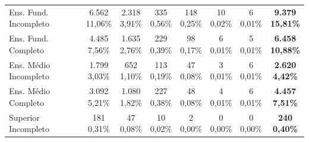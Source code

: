 \documentclass[12pt,a4paper]{article}
\begin{document}
\begin{table}[H]
{\begin{tabular}{lccccccc}
Ens. Fund. Incompleto &
\makecell{6.562 \\ \scriptsize 11,06\%} & \makecell{2.318 \\ \scriptsize 3,91\%} & \makecell{335 \\ \scriptsize 0,56\%} & \makecell{148 \\ \scriptsize 0,25\%} & \makecell{10 \\ \scriptsize 0,02\%} & \makecell{6 \\ \scriptsize 0,01\%} & \makecell{\textbf{9.379} \\ \scriptsize\textbf{15,81\%}} \\
Ens. Fund. Completo &
\makecell{4.485 \\ \scriptsize 7,56\%} & \makecell{1.635 \\ \scriptsize 2,76\%} & \makecell{229 \\ \scriptsize 0,39\%} & \makecell{98 \\ \scriptsize 0,17\%} & \makecell{6 \\ \scriptsize 0,01\%} & \makecell{5 \\ \scriptsize 0,01\%} & \makecell{\textbf{6.458} \\ \scriptsize\textbf{10,88\%}} \\
Ens. Médio Incompleto &
\makecell{1.799 \\ \scriptsize 3,03\%} & \makecell{652 \\ \scriptsize 1,10\%} & \makecell{113 \\ \scriptsize 0,19\%} & \makecell{47 \\ \scriptsize 0,08\%} & \makecell{3 \\ \scriptsize 0,01\%} & \makecell{6 \\ \scriptsize 0,01\%} & \makecell{\textbf{2.620} \\ \scriptsize\textbf{4,42\%}} \\
Ens. Médio Completo &
\makecell{3.092 \\ \scriptsize 5,21\%} & \makecell{1.080 \\ \scriptsize 1,82\%} & \makecell{227 \\ \scriptsize 0,38\%} & \makecell{48 \\ \scriptsize 0,08\%} & \makecell{4 \\ \scriptsize 0,01\%} & \makecell{6 \\ \scriptsize 0,01\%} & \makecell{\textbf{4.457} \\ \scriptsize\textbf{7,51\%}} \\
Superior Incompleto &
\makecell{181 \\ \scriptsize 0,31\%} & \makecell{47 \\ \scriptsize 0,08\%} & \makecell{10 \\ \scriptsize 0,02\%} & \makecell{2 \\ \scriptsize 0,00\%} & \makecell{0 \\ \scriptsize 0,00\%} & \makecell{0 \\ \scriptsize 0,00\%} & \makecell{\textbf{240} \\ \scriptsize\textbf{0,40\%}} \\

\end{tabular}}
\end{table}
\end{document}
